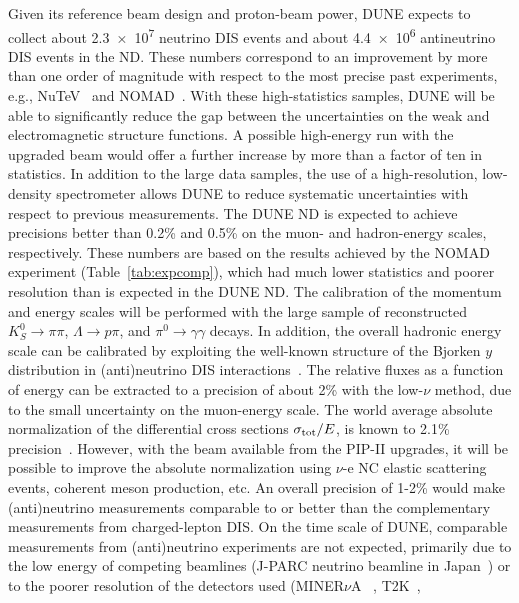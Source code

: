 Given its reference beam design and  proton-beam power, DUNE
expects to collect about \num{2.3e7} neutrino DIS events and
about \num{4.4e6}  antineutrino DIS events in the ND. 
These numbers correspond to an improvement
by more than one order of magnitude with respect to the most precise
past experiments, e.g., NuTeV~\cite{Tzanov:2005kr} and 
NOMAD~\cite{Wu:2007ab,Samoylov:2013xoa}. 
With these high-statistics
samples, DUNE will be able to significantly reduce the gap between the
uncertainties on the weak and electromagnetic structure functions.
A possible high-energy run with the upgraded  beam would offer a 
further increase by more than a factor of ten in statistics.  
In addition to the large data samples, the use of a high-resolution,
low-density spectrometer allows DUNE to reduce systematic
uncertainties with respect to previous measurements. The DUNE ND is
expected to achieve precisions better than 0.2\% and 0.5\% on the muon-
and hadron-energy scales, respectively. 
These numbers are based on the results achieved by the NOMAD experiment
(Table~\ref{tab:expcomp}), which had %
much lower statistics and
poorer resolution than is expected in the DUNE ND. The calibration of the momentum and energy scales
will be performed with the large sample of reconstructed $K^0_S \to \pi \pi$,
$\Lambda \to p \pi$, and $\pi^0 \to \gamma \gamma$ decays.
In addition, the overall hadronic energy scale can be calibrated by exploiting the
well-known structure of the Bjorken $y$ distribution in (anti)neutrino DIS
interactions~\cite{Wu:2007ab,Petti:2011zz}.
%  
The relative fluxes as a function of energy can be extracted to a precision of 
about 2\% with the low-$\nu$ method, due to the small uncertainty on the muon-energy
scale. The world average absolute normalization of the differential
cross sections $\sigma_{\rm tot}/E$, is known to 2.1\%
precision~\cite{Beringer:1900zz}. 
However, with the  beam available from the PIP-II
upgrades, it will be possible to improve the absolute normalization
using $\nu$-e NC elastic scattering events, coherent meson production, etc. 
An overall precision of 1-2\% would make (anti)neutrino
measurements comparable to or better than the complementary measurements from
charged-lepton DIS.
On the time scale of %
DUNE, comparable measurements from
(anti)neutrino experiments are not expected, primarily due to the low
energy of competing beamlines (J-PARC neutrino beamline in Japan~\cite{Sekiguchi:2012xma}) or to the poorer resolution of the detectors
used (MINER$\nu$A~\cite{Osmanov:2011ig} , T2K~\cite{Abe:2011ks},
